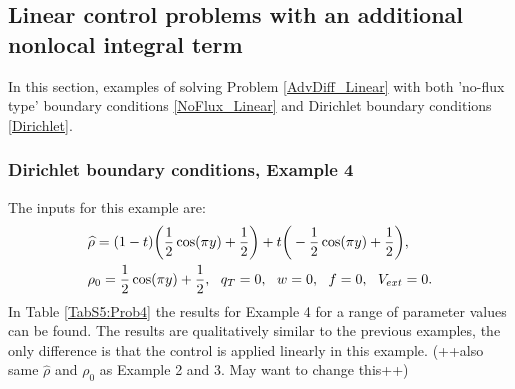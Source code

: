 \subsection{Linear control problems with an additional nonlocal integral term}
In this section, examples of solving Problem \eqref{AdvDiff_Linear} with both 'no-flux type' boundary conditions \eqref{NoFlux_Linear} and Dirichlet boundary conditions \eqref{Dirichlet}.
\subsubsection{Dirichlet boundary conditions, Example 4}
The inputs for this example are:
\begin{align*}
&\widehat \rho = (1 - t)\bigg(\frac{1}{2}\cos(\pi y) + \frac{1}{2}\bigg)  + t\bigg(-\frac{1}{2}\cos(\pi y) + \frac{1}{2}\bigg),\\
&\rho_{0} = \frac{1}{2}\cos(\pi y) + \frac{1}{2},\ \
q_{T} = 0,\ \
{w} = 0,\ \
f =0, \ \
V_{ext} =0.
\end{align*}
In Table \ref{TabS5:Prob4} the results for Example 4 for a range of parameter values can be found. The results are qualitatively similar to the previous examples, the only difference is that the control is applied linearly in this example. (++also same $\widehat \rho$ and $\rho_0$ as Example 2 and 3. May want to change this++)



